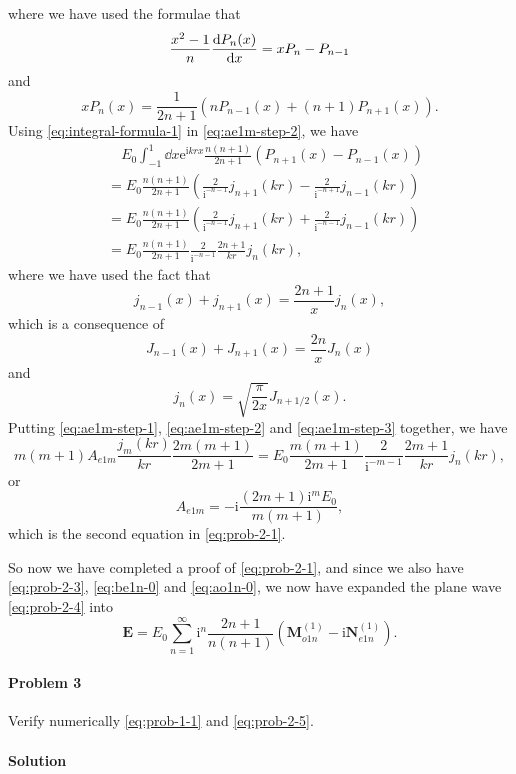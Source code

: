 \documentclass[hyperref, a4paper]{article}
\newcommand*{\ii}{\mathrm{i}}
\newcommand*{\ee}{\mathrm{e}}
\begin{document}
where we have used the formulae that 
\[
    \frac{x^2 - 1}{n} \dv{P_n(x)}{x} = x P_n - P_{n-1}
\]
and 
\[
    x P_n(x) = \frac{1}{2n+1} \left( n P_{n-1}(x) + (n+1) P_{n+1}(x) \right).
\]
Using \eqref{eq:integral-formula-1} in \eqref{eq:ae1m-step-2}, we have 
\begin{equation}
    \begin{aligned}
        &\quad E_0 \int_{-1}^1 \dd{x} \ee^{\ii k r x} \frac{n(n+1)}{2n+1} (P_{n+1}(x) - P_{n-1}(x)) \\
        &= E_0 \frac{n(n+1)}{2n+1} \left( \frac{2}{\ii^{-n-1}} j_{n+1}(kr) - \frac{2}{\ii^{-n+1}} j_{n-1}(kr) \right) \\
        &= E_0 \frac{n(n+1)}{2n+1} \left( \frac{2}{\ii^{-n-1}} j_{n+1}(kr) + \frac{2}{\ii^{-n-1}} j_{n-1}(kr) \right) \\
        &= E_0 \frac{n(n+1)}{2n+1} \frac{2}{\ii^{-n-1}} \frac{2n+1}{kr} j_n(kr),
    \end{aligned}
    \label{eq:ae1m-step-3}
\end{equation}
where we have used the fact that 
\[
    j_{n-1}(x) + j_{n+1}(x) = \frac{2n+1}{x} j_n(x),
\]
which is a consequence of 
\[
    J_{n-1}(x) + J_{n+1}(x) = \frac{2n}{x} J_n(x)
\]
and 
\[
    j_n(x) = \sqrt{\frac{\pi}{2x}} J_{n+1/2}(x).
\]
Putting \eqref{eq:ae1m-step-1}, \eqref{eq:ae1m-step-2} and \eqref{eq:ae1m-step-3} together, we have 
\[
    m(m+1) A_{e1m} \frac{j_m(kr)}{kr} \frac{2m (m+1)}{2m+1} = E_0 \frac{m(m+1)}{2m+1} \frac{2}{\ii^{-m-1}} \frac{2m+1}{kr} j_n(kr),
\]
or 
\[
    A_{e1m} = - \ii \frac{(2m+1) \ii^m E_0}{m(m+1)},
\]
which is the second equation in \eqref{eq:prob-2-1}.

So now we have completed a proof of \eqref{eq:prob-2-1}, and since we also have \eqref{eq:prob-2-3}, \eqref{eq:be1n-0} and \eqref{eq:ao1n-0}, we now have expanded the plane wave \eqref{eq:prob-2-4} into 
\begin{equation}
    \boldsymbol{E}=E_{0} \sum_{n=1}^{\infty} \mathrm{i}^{n} \frac{2 n+1}{n(n+1)} \left( \boldsymbol{M}_{o 1 n}^{(1)}-\mathrm{i} \boldsymbol{N}_{e 1 n}^{(1)} \right).
    \label{eq:prob-2-5}
\end{equation}

\paragraph{}

\paragraph{Problem 3} Verify numerically \eqref{eq:prob-1-1} and \eqref{eq:prob-2-5}. 

\paragraph{Solution} 
\end{document}

